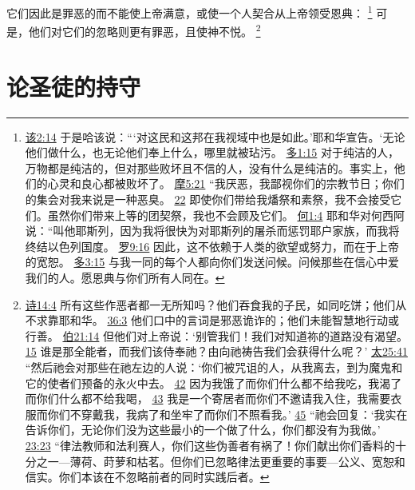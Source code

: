 \documentclass[12pt, a4paper, oneside]{ctexart}
\begin{document}
	它们因此是罪恶的而不能使上帝满意，或使一个人契合从上帝领受恩典：
	\footnote {
		\href{https://biblehub.com/haggai/2-14.htm}{该2:14} 于是哈该说：“‘对这民和这邦在我视域中也是如此。’耶和华宣告。‘无论他们做什么，也无论他们奉上什么，哪里就被玷污。
		\href{https://biblehub.com/titus/1-15.htm}{多1:15} 对于纯洁的人，万物都是纯洁的，但对那些败坏且不信的人，没有什么是纯洁的。事实上，他们的心灵和良心都被败坏了。
		\href{https://biblehub.com/amos/5-21.htm}{摩5:21} “我厌恶，我鄙视你们的宗教节日；你们的集会对我来说是一种恶臭。
		\href{https://biblehub.com/amos/5-22.htm}{22} 即使你们带给我燔祭和素祭，我不会接受它们。虽然你们带来上等的团契祭，我也不会顾及它们。
		\href{https://biblehub.com/hosea/1-4.htm}{何1:4} 耶和华对何西阿说：“叫他耶斯列，因为我将很快为对耶斯列的屠杀而惩罚耶户家族，而我将终结以色列国度。
		\href{https://biblehub.com/romans/9-16.htm}{罗9:16} 因此，这不依赖于人类的欲望或努力，而在于上帝的宽恕。
		\href{https://biblehub.com/titus/3-15.htm}{多3:15} 与我一同的每个人都向你们发送问候。问候那些在信心中爱我们的人。愿恩典与你们所有人同在。
	}
	可是，他们对它们的忽略则更有罪恶，且使神不悦。
	\footnote {
		\href{https://biblehub.com/psalms/14-4.htm}{诗14:4} 所有这些作恶者都一无所知吗？他们吞食我的子民，如同吃饼；他们从不求靠耶和华。
		\href{https://biblehub.com/psalms/36-3.htm}{36:3} 他们口中的言词是邪恶诡诈的；他们未能智慧地行动或行善。
		\href{https://biblehub.com/job/21-14.htm}{伯21:14} 但他们对上帝说：‘别管我们！我们对知道祢的道路没有渴望。
		\href{https://biblehub.com/job/21-15.htm}{15} 谁是那全能者，而我们该侍奉祂？由向祂祷告我们会获得什么呢？’
		\href{https://biblehub.com/matthew/25-41.htm}{太25:41} “然后祂会对那些在祂左边的人说：‘你们被咒诅的人，从我离去，到为魔鬼和它的使者们预备的永火中去。
		\href{https://biblehub.com/matthew/25-42.htm}{42} 因为我饿了而你们什么都不给我吃，我渴了而你们什么都不给我喝，
		\href{https://biblehub.com/matthew/25-43.htm}{43} 我是一个寄居者而你们不邀请我入住，我需要衣服而你们不穿戴我，我病了和坐牢了而你们不照看我。’
		\href{https://biblehub.com/matthew/25-45.htm}{45} “祂会回复：‘我实在告诉你们，无论你们没为这些最小的一个做了什么，你们都没有为我做。’
		\href{https://biblehub.com/matthew/23-23.htm}{23:23} “律法教师和法利赛人，你们这些伪善者有祸了！你们献出你们香料的十分之一---薄荷、莳萝和枯茗。但你们已忽略律法更重要的事要---公义、宽恕和信实。你们本该在不忽略前者的同时实践后者。
	}

\section{论圣徒的持守}
\end{document}

